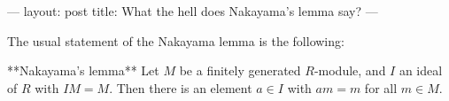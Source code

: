 ---
layout: post
title: What the hell does Nakayama's lemma say?
---

The usual statement of the Nakayama lemma is the following:

**Nakayama's lemma** Let $M$ be a finitely generated $R$-module, and $I$ an ideal of $R$ with $IM=M$. Then there is an element $a \in I$ with $am = m$ for all $m \in M$.


